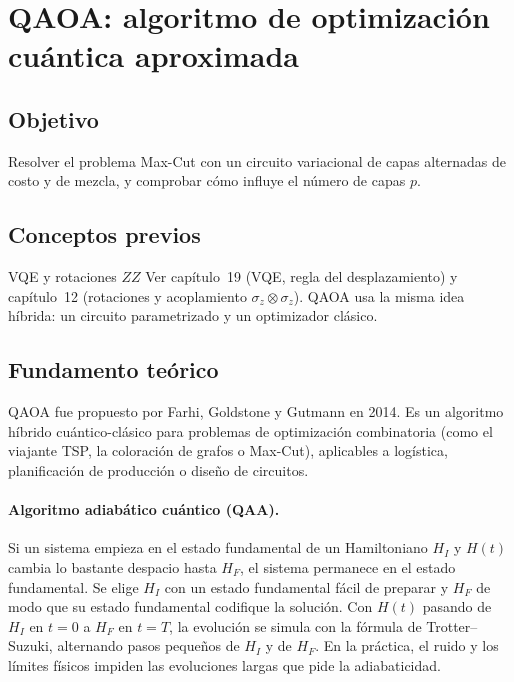 \def\tituloconcepto{QAOA}


\section{QAOA: algoritmo de optimización cuántica aproximada}

\subsection{Objetivo}
Resolver el problema Max-Cut con un circuito variacional de capas alternadas de
costo y de mezcla, y comprobar cómo influye el número de capas $p$.

\subsection{Conceptos previos}
\begin{concepto}{VQE y rotaciones $ZZ$}
Ver capítulo~19 (VQE, regla del desplazamiento) y capítulo~12 (rotaciones y
acoplamiento $\sigma_z\otimes\sigma_z$). QAOA usa la misma idea híbrida: un
circuito parametrizado y un optimizador clásico.
\end{concepto}

\subsection{Fundamento teórico}
QAOA fue propuesto por Farhi, Goldstone y Gutmann en 2014. Es un algoritmo
híbrido cuántico-clásico para problemas de optimización combinatoria (como el
viajante TSP, la coloración de grafos o Max-Cut), aplicables a logística,
planificación de producción o diseño de circuitos.

\paragraph{Algoritmo adiabático cuántico (QAA).} Si un sistema empieza en el
estado fundamental de un Hamiltoniano $H_I$ y $H(t)$ cambia lo bastante despacio
hasta $H_F$, el sistema permanece en el estado fundamental. Se elige $H_I$ con
un estado fundamental fácil de preparar y $H_F$ de modo que su estado
fundamental codifique la solución. Con $H(t)$ pasando de $H_I$ en $t=0$ a $H_F$
en $t=T$, la evolución se simula con la fórmula de Trotter--Suzuki, alternando pasos pequeños de $H_I$ y de
$H_F$. En la práctica, el ruido y los límites físicos impiden las evoluciones
largas que pide la adiabaticidad.


